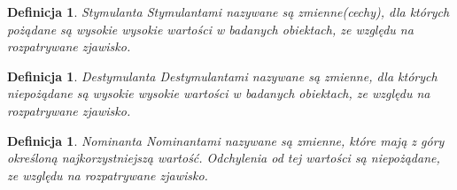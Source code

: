 \documentclass[12pt,a4paper]{report}
\newtheorem{definition}[theorem]{Definicja}
\begin{document}
\begin{itemize}
\end{itemize}

\begin{definition}{Stymulanta \cite[Rozdział 1.5]{panek2013}}
Stymulantami nazywane są zmienne(cechy), dla których pożądane są wysokie wysokie wartości w badanych obiektach, ze względu na rozpatrywane zjawisko. 
\end{definition}

\begin{definition}{Destymulanta \cite[Rozdział 1.5]{panek2013}}
Destymulantami nazywane są zmienne, dla których niepożądane są wysokie wysokie wartości w badanych obiektach, ze względu na rozpatrywane zjawisko. 
\end{definition}

\begin{definition}{Nominanta \cite[Rozdział 1.5]{panek2013}}
Nominantami nazywane są zmienne, które mają z góry określoną najkorzystniejszą wartość. Odchylenia od tej wartości są niepożądane, ze względu na rozpatrywane zjawisko. 
\end{definition}




\end{document}

